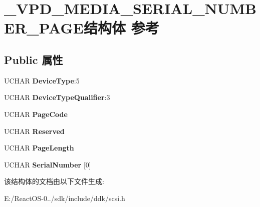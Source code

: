 \hypertarget{struct___v_p_d___m_e_d_i_a___s_e_r_i_a_l___n_u_m_b_e_r___p_a_g_e}{}\section{\+\_\+\+V\+P\+D\+\_\+\+M\+E\+D\+I\+A\+\_\+\+S\+E\+R\+I\+A\+L\+\_\+\+N\+U\+M\+B\+E\+R\+\_\+\+P\+A\+G\+E结构体 参考}
\label{struct___v_p_d___m_e_d_i_a___s_e_r_i_a_l___n_u_m_b_e_r___p_a_g_e}
\subsection*{Public 属性}
\begin{DoxyCompactItemize}
\item 
\mbox{\label{struct___v_p_d___m_e_d_i_a___s_e_r_i_a_l___n_u_m_b_e_r___p_a_g_e_add4d61d309ecd841d43ac1eceab536d6}} 
U\+C\+H\+AR {\bfseries Device\+Type}\+:5
\item 
\mbox{\label{struct___v_p_d___m_e_d_i_a___s_e_r_i_a_l___n_u_m_b_e_r___p_a_g_e_a5c3a4eb484818d6d56fae7dacbdcf2b3}} 
U\+C\+H\+AR {\bfseries Device\+Type\+Qualifier}\+:3
\item 
\mbox{\label{struct___v_p_d___m_e_d_i_a___s_e_r_i_a_l___n_u_m_b_e_r___p_a_g_e_a4f37b77a740d8fa7ff1e0b9e57197625}} 
U\+C\+H\+AR {\bfseries Page\+Code}
\item 
\mbox{\label{struct___v_p_d___m_e_d_i_a___s_e_r_i_a_l___n_u_m_b_e_r___p_a_g_e_aad14d87c623efec6a5045a3967ab7d60}} 
U\+C\+H\+AR {\bfseries Reserved}
\item 
\mbox{\label{struct___v_p_d___m_e_d_i_a___s_e_r_i_a_l___n_u_m_b_e_r___p_a_g_e_a74b90127ddfaa2578dec2b6cbe4bc61e}} 
U\+C\+H\+AR {\bfseries Page\+Length}
\item 
\mbox{\label{struct___v_p_d___m_e_d_i_a___s_e_r_i_a_l___n_u_m_b_e_r___p_a_g_e_a0607478acc137553c082d7ddf1439afb}} 
U\+C\+H\+AR {\bfseries Serial\+Number} \mbox{[}0\mbox{]}
\end{DoxyCompactItemize}


该结构体的文档由以下文件生成\+:\begin{DoxyCompactItemize}
\item 
E\+:/\+React\+O\+S-\/0../sdk/include/ddk/scsi.\+h\end{DoxyCompactItemize}
